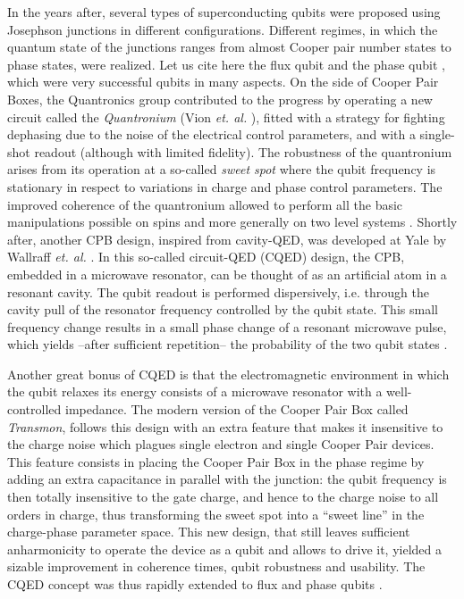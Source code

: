 In the years after, several types of superconducting qubits were proposed
using Josephson junctions in different configurations. Different regimes,
in which the quantum state of the junctions ranges from almost Cooper
pair number states to phase states, were realized. Let us cite here
the flux qubit \citep{mooij_josephson_1999, chiorescu_coherent_2003}
and the phase qubit \citep{martinis_rabi_2002}, which were very
successful qubits in many aspects. On the side of Cooper Pair Boxes,
the Quantronics group contributed to the progress by operating a
new circuit called the \textit{Quantronium} (Vion {\it et. al.} \citep{vion_manipulating_2002}),
fitted with a strategy for fighting dephasing due to the noise of
the electrical control parameters, and with a single-shot
readout (although with limited fidelity). The robustness of the quantronium
arises from its operation at a so-called {\it sweet spot} where the qubit
frequency is stationary in respect to variations in charge and phase control parameters. The improved coherence of
the quantronium allowed to perform all the basic manipulations possible
on spins and more generally on two level systems \citep{collin_nmr-like_2004}.
Shortly after, another CPB design, inspired from
cavity-QED, was developed at Yale by Wallraff {\it et. al.} \citep{wallraff_strong_2004}.
In this so-called circuit-QED (CQED) design, the
CPB, embedded in a microwave resonator, can be thought of as an artificial
atom in a resonant cavity. The qubit readout is performed
dispersively, i.e. through the cavity pull of the resonator frequency
controlled by the qubit state. This small frequency change results
in a small phase change of a resonant microwave pulse, which yields
--after sufficient repetition-- the probability of the two qubit states
\citep{blais_cavity_2004}.

\smallskip{}


Another great bonus of CQED is that the electromagnetic
environment in which the qubit relaxes its energy consists of a microwave
resonator with a well-controlled impedance. The modern
version of the Cooper Pair Box called \textit{Transmon}, follows this
design with an extra feature that makes it insensitive to the charge
noise which plagues single electron and single Cooper Pair devices.
This feature consists in placing the Cooper Pair
Box in the phase regime by adding an extra capacitance in
parallel with the junction: the qubit frequency is then
totally insensitive to the gate charge, and hence to the charge noise to all orders in charge, thus transforming the sweet spot into a ``sweet line'' in the charge-phase parameter space.
This new design, that still leaves sufficient anharmonicity
to operate the device as a qubit and allows to drive it, yielded a
sizable improvement in coherence times, qubit robustness and usability.
The CQED concept was thus rapidly extended to flux and phase qubits \citep{hofheinz_synthesizing_2009}.

